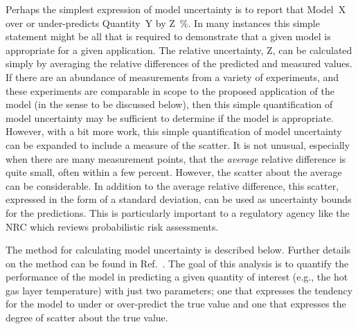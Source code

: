 \documentclass[fleqn,b5paper]{article}
\begin{document}
Perhaps the simplest expression of model uncertainty is to report that Model~X over or under-predicts Quantity~Y by Z~\%. In many instances this simple statement might be all that is required to demonstrate that a given model is appropriate for a given application. The relative uncertainty, Z, can be calculated simply by averaging the relative differences of the predicted and measured values. If there are an abundance of measurements from a variety of experiments, and these experiments are comparable in scope to the proposed application of the model (in the sense to be discussed below), then this simple quantification of model uncertainty may be sufficient to determine if the model is appropriate. However, with a bit more work, this simple quantification of model uncertainty can be expanded to include a measure of the scatter. It is not unusual, especially when there are many measurement points, that the {\em average} relative difference is quite small, often within a few percent. However, the scatter about the average can be considerable. In addition to the average relative difference, this scatter, expressed in the form of a standard deviation, can be used as uncertainty bounds for the predictions. This is particularly important to a regulatory agency like the NRC which reviews probabilistic risk assessments.

The method for calculating model uncertainty is described below. Further details on the method can be found in Ref.~\cite{McGrattan:Metrologia}. The goal of this analysis is to quantify the performance of the model in predicting a given quantity of interest (e.g., the hot gas layer temperature) with just two parameters; one that expresses the tendency for the model to under or over-predict the true value and one that expresses the degree of scatter about the true value.
\end{document}
